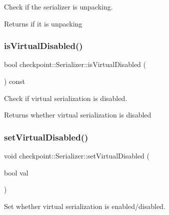 Check if the serializer is unpacking. 

\begin{DoxyReturn}{Returns}
if it is unpacking 
\end{DoxyReturn}
\mbox{\label{structcheckpoint_1_1_serializer_af45e225cdb3a750a06de80a8cd5c6c37}} 
\subsubsection{\texorpdfstring{is\+Virtual\+Disabled()}{isVirtualDisabled()}}
{\footnotesize\ttfamily bool checkpoint\+::\+Serializer\+::is\+Virtual\+Disabled (\begin{DoxyParamCaption}{ }\end{DoxyParamCaption}) const\hspace{0.3cm}{\ttfamily [inline]}}



Check if virtual serialization is disabled. 

\begin{DoxyReturn}{Returns}
whether virtual serialization is disabled 
\end{DoxyReturn}
\mbox{\label{structcheckpoint_1_1_serializer_af57d7cd51e94dd44a5be184456c2d59f}} 
\subsubsection{\texorpdfstring{set\+Virtual\+Disabled()}{setVirtualDisabled()}}
{\footnotesize\ttfamily void checkpoint\+::\+Serializer\+::set\+Virtual\+Disabled (\begin{DoxyParamCaption}\item[{bool}]{val }\end{DoxyParamCaption})\hspace{0.3cm}{\ttfamily [inline]}}



Set whether virtual serialization is enabled/disabled. 


